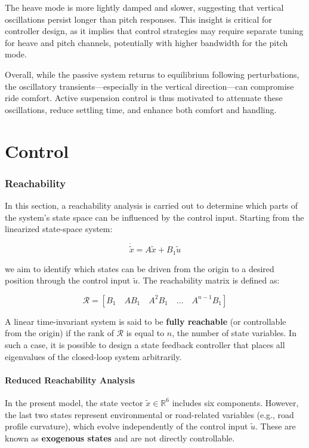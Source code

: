 \documentclass[]{report}
\begin{document}
The heave mode is more lightly damped and slower, suggesting that vertical oscillations persist longer than pitch responses. This insight is critical for controller design, as it implies that control strategies may require separate tuning for heave and pitch channels, potentially with higher bandwidth for the pitch mode.

Overall, while the passive system returns to equilibrium following perturbations, the oscillatory transients—especially in the vertical direction—can compromise ride comfort. Active suspension control is thus motivated to attenuate these oscillations, reduce settling time, and enhance both comfort and handling.



\newpage
\section{Control}

\subsubsection{Reachability}

In this section, a reachability analysis is carried out to determine which parts of the system's state space can be influenced by the control input. Starting from the linearized state-space system:

\[
\dot{\tilde{x}} = A \tilde{x} + B_1 \tilde{u}
\]

we aim to identify which states can be driven from the origin to a desired position through the control input $\tilde{u}$. The reachability matrix is defined as:

\[
\mathcal{R} = \left[ B_1 \quad AB_1 \quad A^2B_1 \quad \dots \quad A^{n-1}B_1 \right]
\]

A linear time-invariant system is said to be \textbf{fully reachable} (or controllable from the origin) if the rank of $\mathcal{R}$ is equal to $n$, the number of state variables. In such a case, it is possible to design a state feedback controller that places all eigenvalues of the closed-loop system arbitrarily.

\paragraph{Reduced Reachability Analysis}

In the present model, the state vector $\tilde{x} \in \mathbb{R}^6$ includes six components. However, the last two states represent environmental or road-related variables (e.g., road profile curvature), which evolve independently of the control input $\tilde{u}$. These are known as \textbf{exogenous states} and are not directly controllable.
\end{document}
